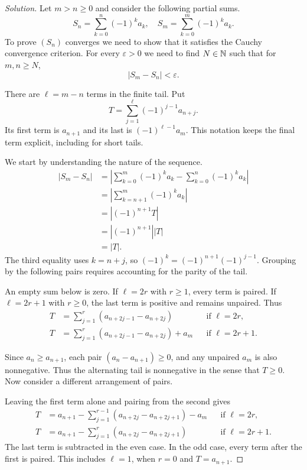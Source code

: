 \begin{proof}[Solution]
  Let $m>n\ge0$ and consider the following partial sums.
  \[
    S_n=\sum_{k=0}^{n}(-1)^k a_k,\quad
    S_m=\sum_{k=0}^{m}(-1)^k a_k.
  \]
  To prove $(S_n)$ converges we need to show that it satisfies the Cauchy
  convergence criterion. For every $\varepsilon>0$
  we need to find $N\in\mathbb{N}$ such that for $m,n\ge N$,
  \[
    |S_m-S_n|<\varepsilon.
  \]

  There are $\ell=m-n$ terms in the finite tail. Put
  \[
    T=\sum_{j=1}^{\ell}(-1)^{j-1}a_{n+j}.
  \]
  Its first term is $a_{n+1}$ and its last is $(-1)^{\ell-1}a_m$.
  This notation keeps the final term explicit, including for short tails.

  We start by understanding the nature of the sequence.
  \begin{align*}
    |S_m-S_n|
      &=\left|\sum_{k=0}^{m}(-1)^k a_k-\sum_{k=0}^{n}(-1)^k a_k\right|\\
      &=\left|\sum_{k=n+1}^{m}(-1)^k a_k\right|\\
      &=\left|(-1)^{n+1}T\right|\\
      &=\left|(-1)^{n+1}\right||T|\\
      &=|T|.
  \end{align*}
  The third equality uses $k=n+j$, so
  $(-1)^k=(-1)^{n+1}(-1)^{j-1}$.
  Grouping by the following pairs requires accounting
  for the parity of the tail.

  An empty sum below is zero.
  If $\ell=2r$ with $r\ge1$, every term is paired. If $\ell=2r+1$
  with $r\ge0$, the last term is positive and remains unpaired. Thus
  \begin{align*}
    T&=\sum_{j=1}^{r}(a_{n+2j-1}-a_{n+2j})
      &&\text{if }\ell=2r,\\
    T&=\sum_{j=1}^{r}(a_{n+2j-1}-a_{n+2j})+a_m
      &&\text{if }\ell=2r+1.
  \end{align*}

  Since $a_n\ge a_{n+1}$, each pair $(a_n-a_{n+1})\ge0$,
  and any unpaired $a_m$ is also nonnegative.
  Thus the alternating tail is nonnegative in the
  sense that $T\ge0$.
  Now consider a different arrangement of pairs.

  Leaving the first term alone and pairing from the second gives
  \begin{align*}
    T&=a_{n+1}-\sum_{j=1}^{r-1}(a_{n+2j}-a_{n+2j+1})-a_m
      &&\text{if }\ell=2r,\\
    T&=a_{n+1}-\sum_{j=1}^{r}(a_{n+2j}-a_{n+2j+1})
      &&\text{if }\ell=2r+1.
  \end{align*}
  The last term is subtracted in the even case. In the odd case,
  every term after the first is paired. This includes $\ell=1$,
  when $r=0$ and $T=a_{n+1}$.


\end{proof}
